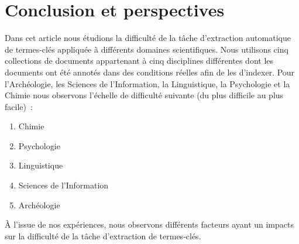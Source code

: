 \section{Conclusion et perspectives}
\label{sec:conclusion_et_perspectives}
  Dans cet article nous étudions la difficulté de la tâche d'extraction
  automatique de termes-clés appliquée à différents domaines scientifiques. Nous
  utilisons cinq collections de documents appartenant à cinq disciplines
  différentes dont les documents ont été annotés dans des conditions réelles
  afin de les d'indexer. Pour l'Archéologie, les Sciences de l'Information, la
  Linguistique, la Psychologie et la Chimie nous observons l'échelle de
  difficulté suivante (du plus difficile au plus facile)~:
  \begin{enumerate}
    \item{Chimie}
    \item{Psychologie}
    \item{Linguistique}
    \item{Sciences de l'Information}
    \item{Archéologie}
  \end{enumerate}

  À l'issue de nos expériences, nous observons différents facteurs ayant un
  impacts sur la difficulté de la tâche d'extraction de termes-clés. 


